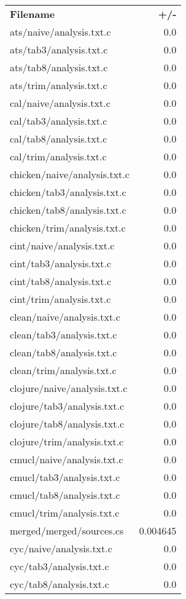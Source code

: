 \begin{longtable}{l r}
\textbf{Filename} &  \textbf{+/-} \\
{ats/naive/analysis.txt.c} & 0.0  \\
{ats/tab3/analysis.txt.c} & 0.0  \\
{ats/tab8/analysis.txt.c} & 0.0  \\
{ats/trim/analysis.txt.c} & 0.0  \\
{cal/naive/analysis.txt.c} & 0.0  \\
{cal/tab3/analysis.txt.c} & 0.0  \\
{cal/tab8/analysis.txt.c} & 0.0  \\
{cal/trim/analysis.txt.c} & 0.0  \\
{chicken/naive/analysis.txt.c} & 0.0  \\
{chicken/tab3/analysis.txt.c} & 0.0  \\
{chicken/tab8/analysis.txt.c} & 0.0  \\
{chicken/trim/analysis.txt.c} & 0.0  \\
{cint/naive/analysis.txt.c} & 0.0  \\
{cint/tab3/analysis.txt.c} & 0.0  \\
{cint/tab8/analysis.txt.c} & 0.0  \\
{cint/trim/analysis.txt.c} & 0.0  \\
{clean/naive/analysis.txt.c} & 0.0  \\
{clean/tab3/analysis.txt.c} & 0.0  \\
{clean/tab8/analysis.txt.c} & 0.0  \\
{clean/trim/analysis.txt.c} & 0.0  \\
{clojure/naive/analysis.txt.c} & 0.0  \\
{clojure/tab3/analysis.txt.c} & 0.0  \\
{clojure/tab8/analysis.txt.c} & 0.0  \\
{clojure/trim/analysis.txt.c} & 0.0  \\
{cmucl/naive/analysis.txt.c} & 0.0  \\
{cmucl/tab3/analysis.txt.c} & 0.0  \\
{cmucl/tab8/analysis.txt.c} & 0.0  \\
{cmucl/trim/analysis.txt.c} & 0.0  \\
{merged/merged/sources.cs} & 0.004645  \\
{cyc/naive/analysis.txt.c} & 0.0  \\
{cyc/tab3/analysis.txt.c} & 0.0  \\
{cyc/tab8/analysis.txt.c} & 0.0  \\

\end{longtable}

